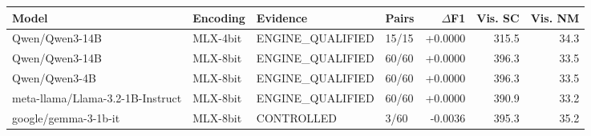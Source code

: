 \begin{tabular}{llllrrr}
\toprule
Model & Encoding & Evidence & Pairs & $\Delta$F1 & Vis. SC & Vis. NM \\
\midrule
Qwen/Qwen3-14B & MLX-4bit & ENGINE\_QUALIFIED & 15/15 & +0.0000 & 315.5 & 34.3 \\
Qwen/Qwen3-14B & MLX-8bit & ENGINE\_QUALIFIED & 60/60 & +0.0000 & 396.3 & 33.5 \\
Qwen/Qwen3-4B & MLX-8bit & ENGINE\_QUALIFIED & 60/60 & +0.0000 & 396.3 & 33.5 \\
meta-llama/Llama-3.2-1B-Instruct & MLX-8bit & ENGINE\_QUALIFIED & 60/60 & +0.0000 & 390.9 & 33.2 \\
google/gemma-3-1b-it & MLX-8bit & CONTROLLED & 3/60 & -0.0036 & 395.3 & 35.2 \\
\bottomrule
\end{tabular}

